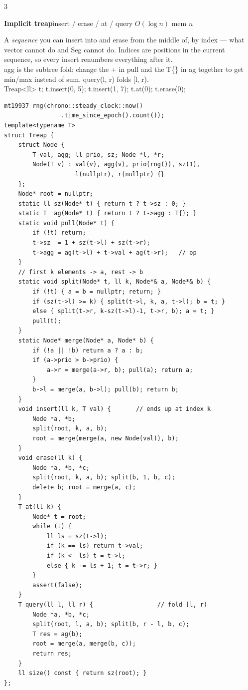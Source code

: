 \documentclass[9pt,a4paper]{extarticle}
\newcommand{\entry}[3]{%
  \addcontentsline{toc}{subsection}{#1}%
  \vspace{0.8ex}%
  \noindent\colorbox{hdbg}{\parbox{\dimexpr\columnwidth-2\fboxsep}{%
    \strut\textbf{#1}\hfill{\footnotesize\textsf{#2}}}}\par
  \vspace{0.4ex}%
  {\footnotesize #3\par}%
}
\newcommand{\code}[1]{{\ttfamily\small #1}}
\begin{document}
\begin{multicols*}{3}
\entry{Implicit treap}{insert / erase / at / query $O(\log n)$ \quad mem $n$}{%
A \emph{sequence} you can insert into and erase from the middle of, by index --- what
\code{vector} cannot do and \code{Seg} cannot do. Indices are positions in the
current sequence, so every insert renumbers everything after it.\\[0.3ex]
\code{agg} is the subtree fold; change the \code{+} in \code{pull} and the \code{T\{\}}
in \code{ag} together to get min/max instead of sum. \code{query(l, r)} folds
\code{[l, r)}.\\[0.3ex]
\code{Treap<ll> t; t.insert(0, 5); t.insert(1, 7); t.at(0); t.erase(0);}}

\begin{lstlisting}
mt19937 rng(chrono::steady_clock::now()
                .time_since_epoch().count());
template<typename T>
struct Treap {
    struct Node {
        T val, agg; ll prio, sz; Node *l, *r;
        Node(T v) : val(v), agg(v), prio(rng()), sz(1),
                    l(nullptr), r(nullptr) {}
    };
    Node* root = nullptr;
    static ll sz(Node* t) { return t ? t->sz : 0; }
    static T  ag(Node* t) { return t ? t->agg : T{}; }
    static void pull(Node* t) {
        if (!t) return;
        t->sz  = 1 + sz(t->l) + sz(t->r);
        t->agg = ag(t->l) + t->val + ag(t->r);   // op
    }
    // first k elements -> a, rest -> b
    static void split(Node* t, ll k, Node*& a, Node*& b) {
        if (!t) { a = b = nullptr; return; }
        if (sz(t->l) >= k) { split(t->l, k, a, t->l); b = t; }
        else { split(t->r, k-sz(t->l)-1, t->r, b); a = t; }
        pull(t);
    }
    static Node* merge(Node* a, Node* b) {
        if (!a || !b) return a ? a : b;
        if (a->prio > b->prio) {
            a->r = merge(a->r, b); pull(a); return a;
        }
        b->l = merge(a, b->l); pull(b); return b;
    }
    void insert(ll k, T val) {       // ends up at index k
        Node *a, *b;
        split(root, k, a, b);
        root = merge(merge(a, new Node(val)), b);
    }
    void erase(ll k) {
        Node *a, *b, *c;
        split(root, k, a, b); split(b, 1, b, c);
        delete b; root = merge(a, c);
    }
    T at(ll k) {
        Node* t = root;
        while (t) {
            ll ls = sz(t->l);
            if (k == ls) return t->val;
            if (k <  ls) t = t->l;
            else { k -= ls + 1; t = t->r; }
        }
        assert(false);
    }
    T query(ll l, ll r) {                  // fold [l, r)
        Node *a, *b, *c;
        split(root, l, a, b); split(b, r - l, b, c);
        T res = ag(b);
        root = merge(a, merge(b, c));
        return res;
    }
    ll size() const { return sz(root); }
};
\end{lstlisting}


\end{multicols*}
\end{document}
